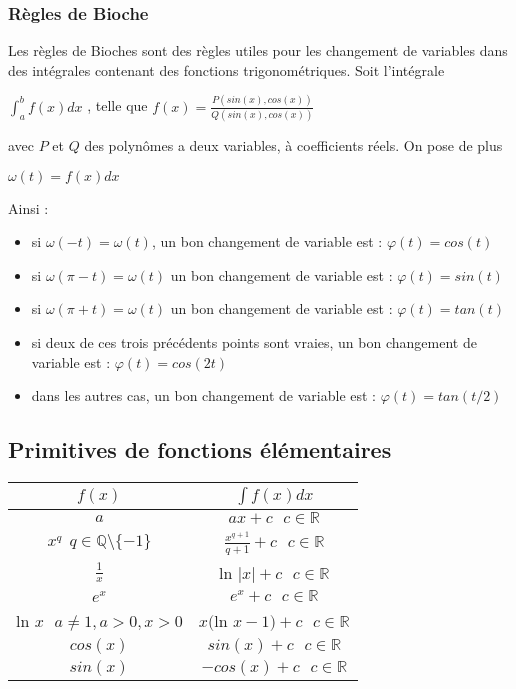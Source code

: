 \documentclass[12pt, a4paper]{book}
\begin{document}
\subsubsection{Règles de Bioche}
Les règles de Bioches sont des règles utiles pour les changement de variables dans des intégrales contenant des fonctions trigonométriques.
Soit l'intégrale 
\begin{center}
    $\int_{a}^{b} f(x) dx$ , telle que $f(x)=\frac{P(sin(x),cos(x))}{Q(sin(x),cos(x))}$
\end{center} avec $P$ et $Q$ des polynômes a deux variables, à coefficients réels.
On pose de plus 
\begin{center}
    $\omega(t) = f(x)dx$
\end{center}
Ainsi :
\begin{itemize}
    \item si $\omega(-t) = \omega(t)$, un bon changement de variable est : $\varphi(t)=cos(t)$ 
    \item si $\omega(\pi-t) = \omega(t)$ un bon changement de variable est : $\varphi(t)=sin(t)$
    \item si $\omega(\pi+t) = \omega(t)$ un bon changement de variable est : $\varphi(t)=tan(t)$
    \item si deux de ces trois précédents points sont vraies,  un bon changement de variable est : $\varphi(t)=cos(2t)$
    \item dans les autres cas,  un bon changement de variable est : $\varphi(t)=tan(t/2)$
\end{itemize}

\newpage
\subsection{Primitives de fonctions élémentaires}
\begin{center}
    \begin{tabular}{|c|c|}
        \hline
       $f(x)$ & $\int f(x)dx$\\
        \hline
        $a$ & $ax+c \ \ \ c \in \mathbb{R}$\\
        $x^q \ \ q \in \mathbb{Q} \setminus \{-1\}$ & $\frac{x^{q+1}}{q+1}+c \ \ \ c \in \mathbb{R}$\\
        $\frac{1}{x}$ & ln $\lvert x \rvert + c \ \ \ c \in \mathbb{R}$\\
        $e^x$ & $e^x + c \ \ \ c \in \mathbb{R}$\\
        ln $x \ \ \ a \not = 1, a>0, x>0$& $x($ln $x-1)+c \ \ \ c \in \mathbb{R}$\\
        $cos(x)$ & $sin(x)+c \ \ \ c \in \mathbb{R}$\\
        $sin(x)$ & $-cos(x)+c \ \ \ c \in \mathbb{R}$\\
        \hline
    \end{tabular}
\end{center}
\end{document}

